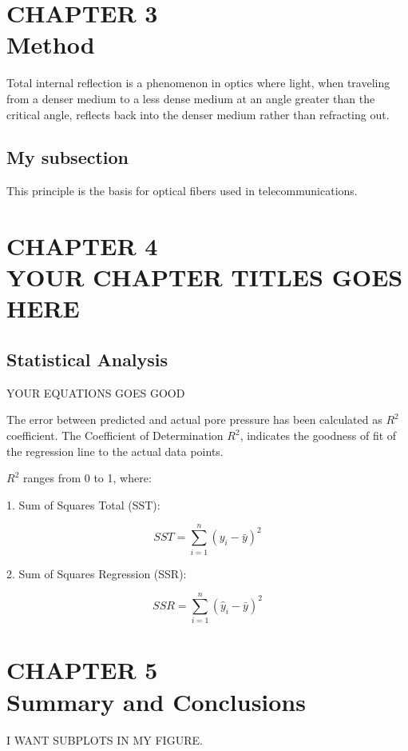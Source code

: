 \documentclass[12pt]{article}
\begin{document}
\newpage
\section*{CHAPTER 3\\ Method }

Total internal reflection is a phenomenon in optics where light, when traveling from a denser medium to a less dense medium at an angle greater than the critical angle, reflects back into the denser medium rather than refracting out. 

\subsection*{My subsection}

This principle is the basis for optical fibers used in telecommunications.

\newpage
\section*{CHAPTER 4\\YOUR CHAPTER TITLES GOES HERE }

\subsection*{Statistical Analysis}

YOUR EQUATIONS GOES GOOD

The error between predicted and actual pore pressure has been calculated as \( R^2 \) coefficient. The Coefficient of Determination  \( R^2 \), indicates the goodness of fit of the regression line to the actual data points.

 \( R^2 \) ranges from 0 to 1, where:
 

1. Sum of Squares Total (SST):

   \[ SST = \sum_{i=1}^{n} (y_i - \bar{y})^2 \]

2. Sum of Squares Regression (SSR):

   \[ SSR = \sum_{i=1}^{n} (\hat{y}_i - \bar{y})^2 \]

\newpage
\section*{CHAPTER 5\\Summary and Conclusions}

I WANT SUBPLOTS IN MY FIGURE. 
\end{document}
